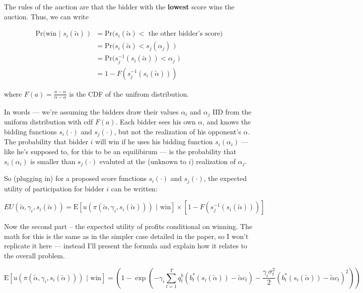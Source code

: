 \documentclass[
]{article}
\begin{document}
The rules of the auction are that the bidder with the \textbf{lowest}
score wins the auction. Thus, we can write 

\begin{align*}
\text{Pr(win | } s_i(\tilde{\alpha}) \text{ )} & = \text{Pr(} s_i(\tilde{\alpha}) < \text{ the other bidder's score)} \\ 
%
& = \text{Pr(} s_i(\tilde{\alpha}) < s_j(\alpha_j)\text{ )} \\
%
& = \text{Pr(} s_j^{-1}(s_i(\tilde{\alpha})) < \alpha_j\text{ )} \\
%
& = 1 - F(s_j^{-1}(s_i(\tilde{\alpha})))
\end{align*}

where
\(F(a) = \frac{a - \underline{\alpha}}{ \overline{\alpha} - \underline{\alpha}}\)
is the CDF of the unifrom distribution.

In words --- we're assuming the bidders draw their values \(\alpha_i\)
and \(\alpha_j\) IID from the uniform distribution with cdf \(F(a)\).
Each bidder sees his own \(\alpha\), and knows the bidding functions
\(s_{i}(\cdot)\) and \(s_{j}(\cdot)\), but not the realization of his
opponent's \(\alpha\). The probability that bidder \(i\) will win if he
uses his bidding function \(s_{i}(\alpha_i)\) --- like he's supposed to,
for this to be an equilibirum --- is the probability that
\(s_{i}(\alpha_i)\) is smaller than \(s_{j}(\cdot)\) evaluted at the
(unknown to \(i\)) realization of \(\alpha_j\).

So (plugging in) for a proposed score functions \(s_{i}(\cdot)\) and
\(s_{j}(\cdot)\), the expected utility of participation for bidder \(i\)
can be written:

\[
EU(\tilde{\alpha}, {\gamma_i}, s_{i}(\tilde{\alpha})) = \text{E}[u(\pi(\tilde{\alpha}, {\gamma_i}, s_{i}(\tilde{\alpha}))) \text{ | win}] \times  [1 - F(s_{j}^{-1}(s_{i}(\tilde{\alpha}))) ]
\]

Now the second part -- the expected utility of profits conditional on
winning. The math for this is the same as in the simpler case detailed
in the paper, so I won't replicate it here --- instead I'll present the
formula and explain how it relates to the overall problem.

\[
 \text{E}[u(\pi(\tilde{\alpha}, {\gamma_i}, s_{i}(\tilde{\alpha}))) \text{ | win}]  = \left(1-\exp \left(-{\gamma_i}  \sum_{t=1}^{T} q_{t}^{b}\left(b_{t}^{*}(s_{i}(\tilde{\alpha}))-\tilde{\alpha} c_{t}\right)-\frac{{\gamma_i} \sigma_{t}^{2}}{2}\left(b_{t}^{*}(s_{i}(\tilde{\alpha}))-\tilde{\alpha} c_{t}\right)^{2}\right)\right)
\]
\end{document}
